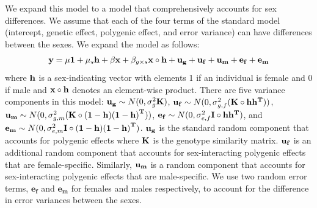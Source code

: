 \documentclass[11pt]{article}
\begin{document}
We expand this model to a model that comprehensively accounts for sex differences.
We assume that each of the four terms of the standard model (intercept, genetic effect, polygenic effect, and error variance) can 
have differences between the sexes.
We expand the model as follows:
\begin{equation}
{\bf y} = \mu {\bf 1} + \mu_s {\bf h} + \beta {\bf x} + \beta_{g \times s} {\bf x \circ h} + {\bf u_g} + {\bf u_f} + \mathbf{u_m} + {\bf e_f} + {\bf e_m} 
\label{eq:comprehensive}
\end{equation}
where ${\bf h}$ is a sex-indicating vector with elements 1 if an individual is female and 0 if male and 
${\bf x \circ h}$ denotes an element-wise product.
There are five variance components in this model:
${\bf u_g} \sim N(0, \sigma^2_g {\bf K} )$, 
${\bf u_f} \sim N(0, \sigma^2_{g, f} ({\bf K} \circ \bf{h}\bf{h}^T))$,
${\bf u_m} \sim N(0, \sigma^2_{g, m} ({\bf K} \circ \bf{(1-h)(1-h)}^T))$,
${\bf e_f} \sim N(0, \sigma^2_{e,f} {\bf I \circ \bf{h}\bf{h}^T})$, 
and ${\bf e_m} \sim N(0, \sigma^2_{e,m} {\bf I \circ \bf{(1-h)(1-h)}^T})$.
${\bf u_g}$ is the standard random component that accounts for polygenic effects where ${\bf K}$ is the genotype similarity matrix.
${\bf u_{f}}$ is an additional random component that accounts for sex-interacting polygenic effects that are female-specific.
Similarly, ${\bf u_{m}}$ is a random component that accounts for sex-interacting polygenic effects that are male-specific.
We use two random error terms, $\mathbf{e_f}$ and $\mathbf{e_m}$ for females and males respectively,
to account for the difference in error variances between the sexes.
\end{document}
